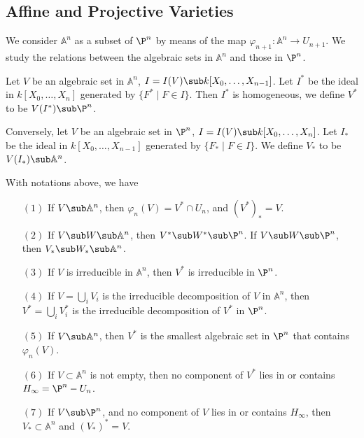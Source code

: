 \subsection{Affine and Projective Varieties}
We consider $\mathbb{A}^n$ as a subset of $\P^n$ by means of the map $\varphi_{n+1}:\mathbb{A}^n\to U_{n+1}$. We study the relations between the algebraic sets in $\mathbb{A}^n$ and those in $\P^n$.\par
Let $V$ be an algebraic set in $\mathbb{A}^n$, $I=I(V)\sub k[X_0,\dots,X_{n-1}]$. Let $I^*$ be the ideal in $k[X_0,\dots,X_n]$ generated by $\{F^*\mid F\in I\}$. Then $I^*$ is homogeneous, we define $V^*$ to be $V(I^*)\sub\P^n$.\par
Conversely, let $V$ be an algebraic set in $\P^n$, $I=I(V)\sub k[X_0,\dots,X_n]$. Let $I_*$ be the ideal in $k[X_0,\dots,X_{n-1}]$ generated by $\{F_*\mid F\in I\}$. We define $V_*$ to be $V(I_*)\sub\mathbb{A}^n$.
\begin{proposition}
With notations above, we have
\begin{itemize}
\item[$(1)$] If $V\sub\mathbb{A}^n$, then $\varphi_{n}(V)=V^*\cap U_{n}$, and $(V^*)_*=V$.
\item[$(2)$] If $V\sub W\sub\mathbb{A}^n$, then $V^*\sub W^*\sub\P^n$. If $V\sub W\sub\P^n$, then $V_*\sub W_*\sub\mathbb{A}^n$.
\item[$(3)$] If $V$ is irreducible in $\mathbb{A}^n$, then $V^*$ is irreducible in $\P^n$.
\item[$(4)$] If $V=\bigcup_iV_i$ is the irreducible decomposition of $V$ in $\mathbb{A}^n$, then $V^*=\bigcup_iV_i^*$ is the irreducible decomposition of $V^*$ in $\P^n$.
\item[$(5)$] If $V\sub\mathbb{A}^n$, then $V^*$ is the smallest algebraic set in $\P^n$ that contains $\varphi_{n}(V)$.
\item[$(6)$] If $V\subset\mathbb{A}^n$ is not empty, then no component of $V^*$ lies in or contains $H_\infty=\P^n-U_{n}$.
\item[$(7)$] If $V\sub\P^n$, and no component of $V$ lies in or contains $H_\infty$, then $V_*\subset\mathbb{A}^n$ and $(V_*)^*=V$.
\end{itemize}
\end{proposition}
